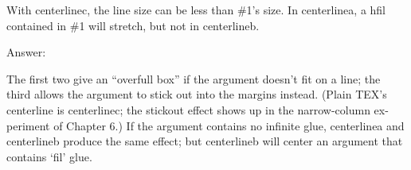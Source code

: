\def\centerlinea#1{\line{\hfil#1\hfil}}
\def\centerlineb#1{\line{\hfill#1\hfill}}
\def\centerlinec#1{\line{\hss#1\hss}}

With centerlinec, the line size can be less than \#1's size.
In centerlinea, a hfil contained in \#1 will stretch, but not in centerlineb.

Answer:

The first two give an “overfull box” if the argument doesn’t fit on a line;
the third allows the argument to stick out into the margins instead. (Plain TEX’s
centerline is centerlinec; the stickout effect shows up in the narrow-column ex-
periment of Chapter 6.) If the argument contains no infinite glue, centerlinea and
centerlineb produce the same effect; but centerlineb will center an argument that
contains ‘fil’ glue.

\bye

